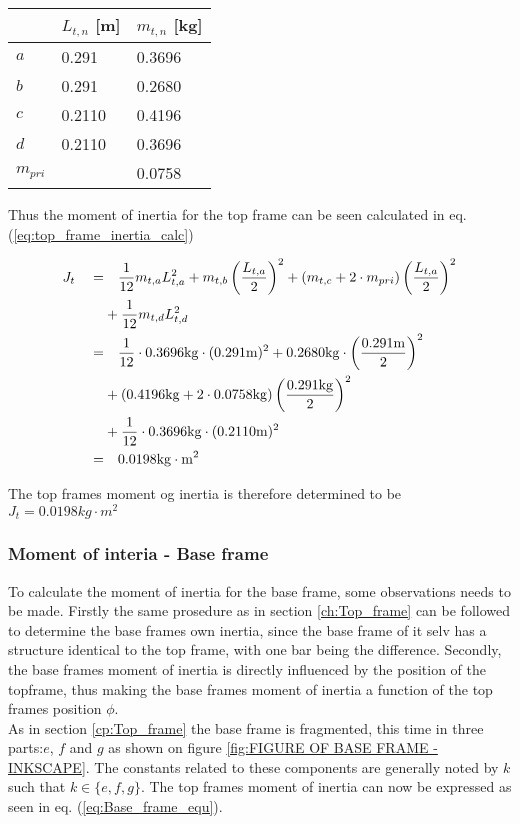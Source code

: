 \documentclass[../../main]{subfiles}
\begin{document}
\begin{table}[H]
\centering
\begin{tabular}{|l|l|l|}
\hline
  & $L_{t,n}$ [m]  & $m_{t,n}$ [kg]  \\
\hline
$a$ & 0.291  & 0.3696  \\
\hline
$b$ & 0.291  & 0.2680  \\
\hline
$c$ & 0.2110 & 0.4196  \\
\hline
$d$ & 0.2110 & 0.3696  \\
\hline
$m_{pri}$ & & 0.0758 \\
\hline
\end{tabular}
    \label{tab:mass_table}
\end{table}

Thus the moment of inertia for the top frame can be seen calculated in eq. (\ref{eq:top_frame_inertia_calc})

\begin{equation}
  \centering
    \label{eq:top_frame_inertia_calc}
  \begin{split}
      J_t  \quad  =&  \quad \frac{1}{12} m_{t,a}L_{t,a}^2 + m_{t,b}\left(\frac{L_{t,a}}{2}\right)^2 + (m_{t,c} + 2\cdot m_{pri})\left(\frac{L_{t,a}}{2}\right)^2 \\
      &+ \frac{1}{12}m_{t,d}L_{t,d}^2 \\
      =& \quad  \frac{1}{12} \cdot 0.3696 \si{kg}  \cdot (0.291 \si{m})^2 + 0.2680 \si{kg} \cdot \left(\frac{0.291 \si{m}}{2}\right)^2 \\
      &+ (0.4196 \si{kg} + 2\cdot 0.0758 \si{kg})\left(\frac{0.291\si{kg}}{2}\right)^2 \\
      &+ \frac{1}{12} \cdot 0.3696\si{kg} \cdot (0.2110\si{m})^2 \\
      =& \quad 0.0198 \si{kg\cdot m^2}
  \end{split}
\end{equation}

The top frames moment og inertia is therefore determined to be
\newline $J_{t} = 0.0198 \si{kg\cdot m^2}$

\subsubsection{Moment of interia - Base frame}

To calculate the moment of inertia for the base frame, some observations needs to be made. Firstly the same prosedure as in section \ref{ch:Top_frame} can be followed to determine the base frames own inertia, since the base frame of it selv has a structure identical to the top frame, with one bar being the difference. Secondly, the base frames moment of inertia is directly influenced by the position of the topframe, thus making the base frames moment of inertia a function of the top frames position $\phi$.\\
As in section \ref{cp:Top_frame} the base frame is fragmented, this time in three parts:$e$, $f$ and $g$ as shown on figure \ref{fig:FIGURE OF BASE FRAME - INKSCAPE}. The constants related to these components are generally noted by $k$ such that $k \in \{e,f,g\}$. The top frames moment of inertia can now be expressed as seen in eq. (\ref{eq:Base_frame_equ}).
\end{document}
